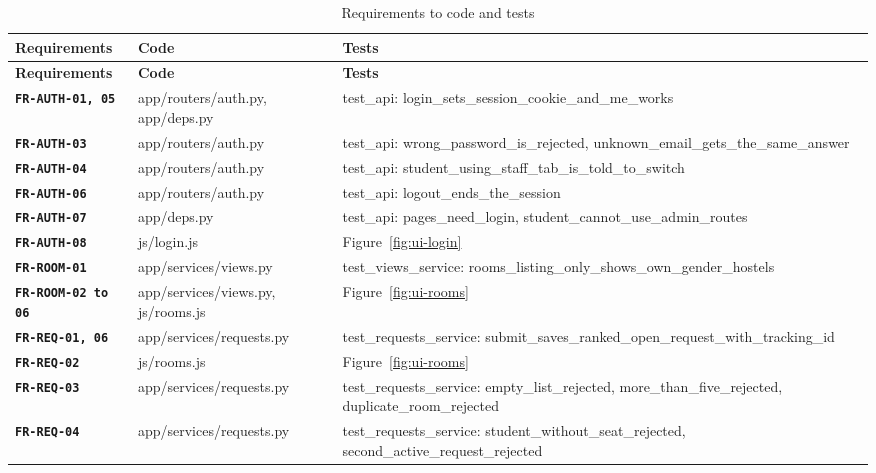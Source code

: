 \documentclass[11pt,a4paper,parskip=half,toc=listof]{scrreprt}
\newcommand{\Req}[1]{\textbf{\texttt{#1}}}
\begin{document}
\newcommand{\Test}[1]{{\small\ttfamily #1}}
\begin{xltabular}{\linewidth}{@{}L{2.75cm}L{4.7cm}Y@{}}
  \caption{Requirements to code and tests}\label{tab:trace}\\
  \toprule
  \textbf{Requirements} & \textbf{Code} & \textbf{Tests}\\
  \midrule
  \endfirsthead
  \toprule
  \textbf{Requirements} & \textbf{Code} & \textbf{Tests}\\
  \midrule
  \endhead
  \bottomrule
  \endlastfoot
  \Req{FR-AUTH-01, 05} & \Test{app/routers/auth.py}, \Test{app/deps.py} &
    \Test{test\_api}: \Test{login\_sets\_session\_cookie\_and\_me\_works}\\
  \Req{FR-AUTH-03} & \Test{app/routers/auth.py} & \Test{test\_api}:
    \Test{wrong\_password\_is\_rejected},
    \Test{unknown\_email\_gets\_the\_same\_answer}\\
  \Req{FR-AUTH-04} & \Test{app/routers/auth.py} & \Test{test\_api}:
    \Test{student\_using\_staff\_tab\_is\_told\_to\_switch}\\
  \Req{FR-AUTH-06} & \Test{app/routers/auth.py} & \Test{test\_api}:
    \Test{logout\_ends\_the\_session}\\
  \Req{FR-AUTH-07} & \Test{app/deps.py} & \Test{test\_api}:
    \Test{pages\_need\_login}, \Test{student\_cannot\_use\_admin\_routes}\\
  \Req{FR-AUTH-08} & \Test{js/login.js} & Figure~\ref{fig:ui-login}\\
  \midrule
  \Req{FR-ROOM-01} & \Test{app/services/views.py} &
    \Test{test\_views\_service}:
    \Test{rooms\_listing\_only\_shows\_own\_gender\_hostels}\\
  \Req{FR-ROOM-02 to 06} & \Test{app/services/views.py},
    \Test{js/rooms.js} & Figure~\ref{fig:ui-rooms}\\
  \midrule
  \Req{FR-REQ-01, 06} & \Test{app/services/requests.py} &
    \Test{test\_requests\_service}:
    \Test{submit\_saves\_ranked\_open\_request\_with\_tracking\_id}\\
  \Req{FR-REQ-02} & \Test{js/rooms.js} & Figure~\ref{fig:ui-rooms}\\
  \Req{FR-REQ-03} & \Test{app/services/requests.py} &
    \Test{test\_requests\_service}: \Test{empty\_list\_rejected},
    \Test{more\_than\_five\_rejected}, \Test{duplicate\_room\_rejected}\\
  \Req{FR-REQ-04} & \Test{app/services/requests.py} &
    \Test{test\_requests\_service}: \Test{student\_without\_seat\_rejected},
    \Test{second\_active\_request\_rejected}\\

\end{xltabular}
\end{document}
